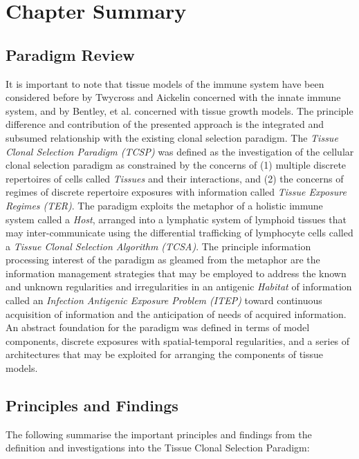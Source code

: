%
%
\section{Chapter Summary}
\label{sec:tissues:summary}

%
%
\subsection{Paradigm Review}
It is important to note that tissue models of the immune system have been considered before by Twycross and Aickelin \cite{Twycross2005} concerned with the innate immune system, and by Bentley, et al. \cite{Bentley2005} concerned with tissue growth models. The principle difference and contribution of the presented approach is the integrated and subsumed relationship with the existing clonal selection paradigm.
The \emph{Tissue Clonal Selection Paradigm (TCSP)} was defined as the investigation of the cellular clonal selection paradigm as constrained by the concerns of (1) multiple discrete repertoires of cells called \emph{Tissues} and their interactions, and (2) the concerns of regimes of discrete repertoire exposures with information called \emph{Tissue Exposure Regimes (TER)}. The paradigm exploits the metaphor of a holistic immune system called a \emph{Host}, arranged into a lymphatic system of lymphoid tissues that may inter-communicate using the differential trafficking of lymphocyte cells called a \emph{Tissue Clonal Selection Algorithm (TCSA)}. The principle information processing interest of the paradigm as gleamed from the metaphor are the information management strategies that may be employed to address the known and unknown regularities and irregularities in an antigenic \emph{Habitat} of information called an \emph{Infection Antigenic Exposure Problem (ITEP)} toward continuous acquisition of information and the anticipation of needs of acquired information. An abstract foundation for the paradigm was defined in terms of model components, discrete exposures with spatial-temporal regularities, and a series of architectures that may be exploited for arranging the components of tissue models. 


%
%
\subsection{Principles and Findings}
The following summarise the important principles and findings from the definition and investigations into the Tissue Clonal Selection Paradigm:

